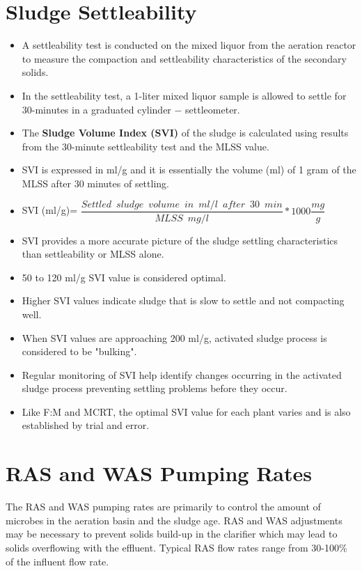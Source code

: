 \section{Sludge Settleability}

\begin{itemize}
\item A settleability test is conducted on the mixed liquor from the aeration reactor to  measure the compaction and settleability characteristics of the secondary solids.
\item In the settleability test, a 1-liter mixed liquor sample is allowed to settle for 30-minutes in a graduated cylinder $-$ settleometer. 
\item The \textbf{Sludge Volume Index (SVI)} of the sludge is calculated using results from the 30-minute settleability test and the MLSS value.
\item SVI is expressed in ml/g and it is essentially the volume (ml) of 1 gram of the MLSS after 30 minutes of settling.
\item SVI (ml/g)= $\dfrac{Settled \enspace sludge \enspace volume \enspace in \enspace ml/l \enspace after \enspace 30 \enspace min}{MLSS \enspace mg/l}*1000 \dfrac{mg}{g}$
\item SVI provides a more accurate picture of the sludge settling characteristics than settleability or MLSS alone.
\item 50 to 120 ml/g SVI value is considered optimal.
\item Higher SVI values  indicate sludge that is slow to settle and not compacting well.
\item When SVI values are approaching 200 ml/g, activated sludge process is considered to be "bulking".
\item Regular monitoring of SVI help identify changes occurring in the activated sludge process preventing settling problems before they occur.
\item Like F:M and MCRT, the optimal SVI value for each plant varies and is also established by trial and error.
\end{itemize}
\vspace{5mm}

\section{RAS and WAS Pumping Rates}

The RAS and WAS pumping rates are primarily to control the amount of microbes in the aeration basin and the sludge age.  RAS and WAS adjustments may be necessary to prevent solids build-up in the clarifier which may lead to solids overflowing  with the effluent. Typical RAS flow rates range from 30-100\% of the influent flow rate.

